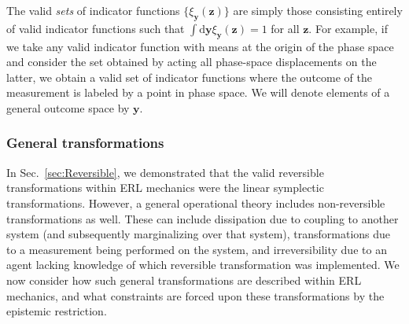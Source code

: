\documentclass[pra,superscriptaddress,nofootinbib,12pt]{revtex4-2}
\begin{document}

The valid \emph{sets} of indicator functions $\{ \xi_{\mathbf{y}}(\mathbf{z}) \}$ are simply those consisting entirely of valid indicator functions such that $\int \textrm{d}\mathbf{y}\xi_{\mathbf{y}}(\mathbf{z})=1$ for all $\mathbf{z}$.  For example, if we take any valid indicator function with means at the origin of the phase space and consider the set obtained by acting all phase-space displacements on the latter, we obtain a valid set of indicator functions where the outcome of the measurement is labeled by a point in phase space.   We will denote elements of a general outcome space by $\mathbf{y}$.


\subsubsection{General transformations}

In Sec.~\ref{sec:Reversible}, we demonstrated that the valid reversible transformations within ERL mechanics were the linear symplectic transformations.  However, a general operational theory includes non-reversible transformations as well.  These can include dissipation due to coupling to another system (and subsequently marginalizing over that system), transformations due to a measurement being performed on the system, and irreversibility due to an agent lacking knowledge of which reversible transformation was implemented.  We now consider how such general transformations are described within ERL mechanics, and what constraints are forced upon these transformations by the epistemic restriction.
\end{document}
